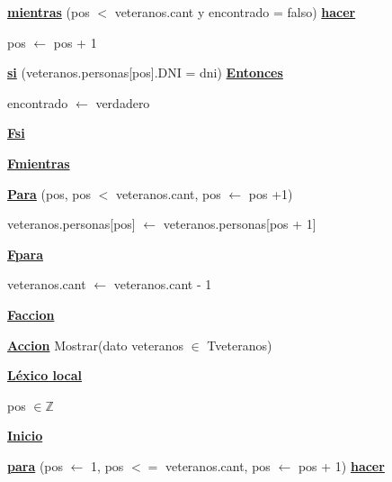 \documentclass{article}
\begin{document}
            \hspace{12mm}\underline{\textbf{mientras}} (pos $<$ veteranos.cant y encontrado = falso) \underline{\textbf{hacer}}

                \hspace{16mm}pos $\leftarrow$ pos + 1

                \hspace{16mm}\underline{\textbf{si}} (veteranos.personas[pos].DNI = dni) \underline{\textbf{Entonces}}

                    \hspace{20mm}encontrado $\leftarrow$ verdadero

                \hspace{16mm}\underline{\textbf{Fsi}}

            \hspace{12mm}\underline{\textbf{Fmientras}}

            \hspace{12mm}\underline{\textbf{Para}} (pos, pos $<$ veteranos.cant, pos $\leftarrow$ pos +1)

                \hspace{16mm}veteranos.personas[pos] $\leftarrow$ veteranos.personas[pos + 1]

            \hspace{12mm}\underline{\textbf{Fpara}}

            \hspace{12mm}veteranos.cant $\leftarrow$ veteranos.cant - 1

    \hspace{4mm}\underline{\textbf{Faccion}}

    \vspace{4mm}

    \hspace{4mm}\underline{\textbf{Accion}} Mostrar(dato veteranos $\in$ Tveteranos)

        \hspace{8mm}\underline{\textbf{Léxico local}}

            \hspace{12mm}pos $\in \mathbb{Z}$

        \hspace{8mm}\underline{\textbf{Inicio}}

            \hspace{12mm}\underline{\textbf{para}} (pos $\leftarrow$ 1, pos $<=$ veteranos.cant, pos $\leftarrow$ pos + 1)
            \underline{\textbf{hacer}}
\end{document}
